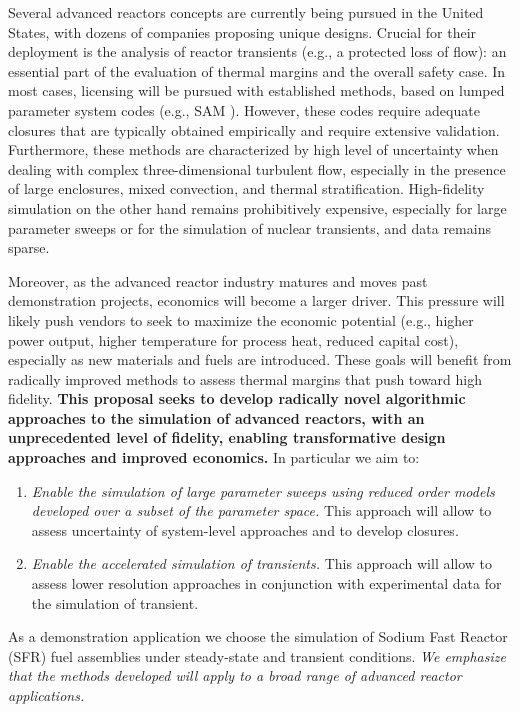 Several  advanced reactors concepts are currently being pursued in the United
States, with dozens of companies proposing unique designs. Crucial for their
deployment is the analysis of  reactor transients (e.g., a protected loss of
flow): an essential part of the evaluation of thermal margins and the overall
safety case.  In most cases, licensing will be pursued with established
methods, based on lumped parameter system codes (e.g., SAM \cite{hu2021}).
However, these codes require adequate closures that are typically obtained
empirically and require extensive validation. Furthermore, these methods are
characterized by high level of uncertainty when dealing with complex
three-dimensional turbulent flow, especially in the presence of large
enclosures, mixed convection, and thermal stratification. High-fidelity
simulation on the other hand remains prohibitively expensive, especially for
large parameter sweeps or for the simulation of nuclear transients, and data
remains sparse.

Moreover, as the advanced reactor industry matures and moves past demonstration
projects, economics will become a larger driver. This pressure will likely push
vendors to seek to maximize the economic potential (e.g., higher power output,
higher temperature for process heat, reduced capital cost), especially as new
materials and fuels are introduced. These goals will benefit from radically
improved methods to assess thermal margins that push toward high fidelity.
\textbf{This proposal seeks to develop radically novel algorithmic approaches
to the simulation of advanced reactors, with an unprecedented level of
fidelity, enabling transformative design approaches and improved economics.} In
particular we aim to: 
\begin{enumerate}
%
   \item \textit{Enable the simulation of large parameter sweeps using reduced
   order models developed over a subset of the parameter space.} This approach
   will allow to assess uncertainty of system-level approaches and to develop
   closures.
%
   \item \textit{Enable the accelerated simulation of transients.}
   This approach will allow to assess lower resolution approaches in conjunction
   with experimental data for the simulation of transient.  
\end{enumerate}
As a demonstration application we choose the simulation of Sodium Fast Reactor
(SFR) fuel assemblies under steady-state and transient conditions. \textit{We
emphasize that the methods developed will apply to a broad range of advanced
reactor applications.}

